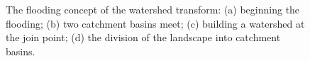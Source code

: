 \documentclass[review,a4paper]{elsarticle}
\newenvironment{stusubfig}[1]
{
	\begin{figure}[#1]
	\begin{center}
}
{
	\end{center}
	\end{figure}
}
\begin{document}
\begin{stusubfig}{p}
	\hspace{4mm}%
	\hspace{4mm}%
	\hspace{4mm}%
\caption{The flooding concept of the watershed transform: (a) beginning the flooding; (b) two catchment basins meet; (c) building a watershed at the join point; (d) the division of the landscape into catchment basins.}
\label{fig:segmentation-watershed-floodingconcept}
\end{stusubfig}
\end{document}

